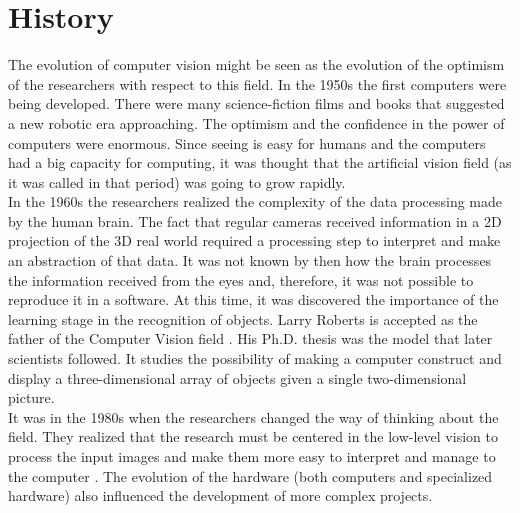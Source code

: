 \section{History}

The evolution of computer vision might be seen as the evolution of the optimism of the researchers with respect to this field. 
In the 1950s the first computers were being developed. There were many science-fiction films and books that suggested a new robotic era approaching. The optimism and the confidence in the power of computers were enormous. 
Since seeing is easy for humans and the computers had a big capacity for computing, it was thought that the artificial vision field (as it was called in that period) was going to grow rapidly. 
\\

In the 1960s the researchers %
realized the complexity of the data processing made by the human brain.
The fact that regular cameras received information in a 2D projection of the 3D real world required a processing step to interpret and make an abstraction of that data.
It was not known by then how the brain processes the information received from the eyes and, therefore, it was not possible to reproduce it in a software. 
At this time, it was discovered the importance of the learning stage in the recognition of objects. 
Larry Roberts is accepted as the father of the Computer Vision field \cite{Huang}.
His Ph.D. thesis %
\cite{Roberts1963} was the model that later scientists followed. %
It studies the possibility of making a computer construct and display a three-dimensional array of objects given a single two-dimensional picture. 
\\

 It was in the 1980s when the researchers changed the way of thinking about the field.
They realized that the research must be centered in the low-level vision to process the input images and make them more easy to interpret and manage to the computer \cite{Huang}. 
The evolution of the hardware (both computers and specialized hardware) also influenced the development of more complex projects. 
\\

